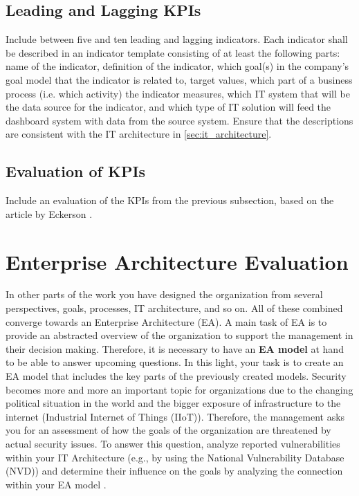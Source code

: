 \documentclass[12pt,a4paper]{article}
\begin{document}
\subsection{Leading and Lagging KPIs}

Include between five and ten leading and lagging indicators.
Each indicator shall be described in an indicator template consisting of at least the following parts: name of the indicator,
definition of the indicator, which goal(s) in the company's goal model that the indicator is related to, target values, which
part of a business process (i.e. which activity) the indicator measures, which IT system that will be the data source for the
indicator, and which type of IT solution will feed the dashboard system with data from the source system.
Ensure that the descriptions are consistent with the IT architecture in \autoref{sec:it_architecture}.

\subsection{Evaluation of KPIs}

Include an evaluation of the KPIs from the previous subsection, based on the article by Eckerson
\cite[ch.~11, pp.~197--216]{Eckerson2010_Performance}.

\section{Enterprise Architecture Evaluation} \label{sec:vulnerabilities}

In other parts of the work you have designed the organization from several perspectives, goals, processes, IT architecture, and so
on.
All of these combined converge towards an Enterprise Architecture (EA).
A main task of EA is to provide an abstracted overview of the organization to support the management in their decision making.
Therefore, it is necessary to have an \textbf{EA model} at hand to be able to answer upcoming questions.
In this light, your task is to create an EA model that includes the key parts of the previously created models.
Security becomes more and more an important topic for organizations due to the changing political situation in the world and the
bigger exposure of infrastructure to the internet (Industrial Internet of Things (IIoT)).
Therefore, the management asks you for an assessment of how the goals of the organization are threatened by actual security
issues.
To answer this question, analyze reported vulnerabilities within your IT Architecture (e.g., by using the National Vulnerability
Database (NVD)) and determine their influence on the goals by analyzing the connection within your EA model
\cite{Ebbers2021_IIoTVulnerabilities}.

\conclusion
\end{document}
